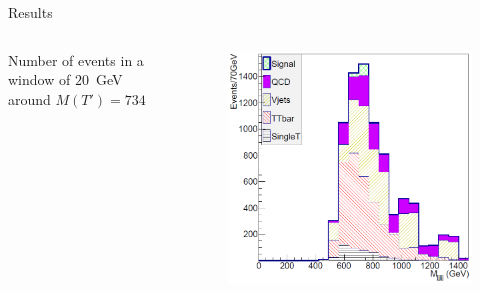 \begin{frame}{Results}
\vspace{-2.5cm}

\begin{columns}
\begin{column}{.50\textwidth}
\begin{block}{}\scriptsize
Number of events in a window of $20$~GeV around $M(T')=734$ \GeVcc\\
\vspace{1.0cm}
\end{block}
\end{column}

\begin{column}{.50\textwidth}
\begin{figure}[!Hhtbp]
  \begin{center}
    \includegraphics[width=1.0\textwidth]{../figs/Pheno/Final.png}
  \end{center}
\end{figure}
\end{column}
\end{columns}



\end{frame}
